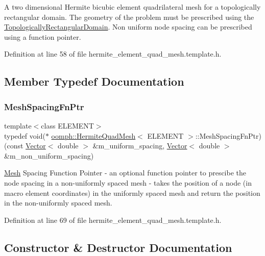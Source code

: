 A two dimensional Hermite bicubic element quadrilateral mesh for a topologically rectangular domain. The geometry of the problem must be prescribed using the \hyperlink{classoomph_1_1TopologicallyRectangularDomain}{Topologically\+Rectangular\+Domain}. Non uniform node spacing can be prescribed using a function pointer. 

Definition at line 58 of file hermite\+\_\+element\+\_\+quad\+\_\+mesh.\+template.\+h.



\subsection{Member Typedef Documentation}
\mbox{\label{classoomph_1_1HermiteQuadMesh_abebf4806b300591f976398404ed0ef3f}} 
\subsubsection{\texorpdfstring{Mesh\+Spacing\+Fn\+Ptr}{MeshSpacingFnPtr}}
{\footnotesize\ttfamily template$<$class E\+L\+E\+M\+E\+NT$>$ \\
typedef void($\ast$ \hyperlink{classoomph_1_1HermiteQuadMesh}{oomph\+::\+Hermite\+Quad\+Mesh}$<$ E\+L\+E\+M\+E\+NT $>$\+::Mesh\+Spacing\+Fn\+Ptr) (const \hyperlink{classoomph_1_1Vector}{Vector}$<$ double $>$ \&m\+\_\+uniform\+\_\+spacing, \hyperlink{classoomph_1_1Vector}{Vector}$<$ double $>$ \&m\+\_\+non\+\_\+uniform\+\_\+spacing)}



\hyperlink{classoomph_1_1Mesh}{Mesh} Spacing Function Pointer -\/ an optional function pointer to prescibe the node spacing in a non-\/uniformly spaced mesh -\/ takes the position of a node (in macro element coordinates) in the uniformly spaced mesh and return the position in the non-\/uniformly spaced mesh. 



Definition at line 69 of file hermite\+\_\+element\+\_\+quad\+\_\+mesh.\+template.\+h.



\subsection{Constructor \& Destructor Documentation}
\mbox{\label{classoomph_1_1HermiteQuadMesh_aea2e2144668d092f4e358f195bbc74e7}} 
